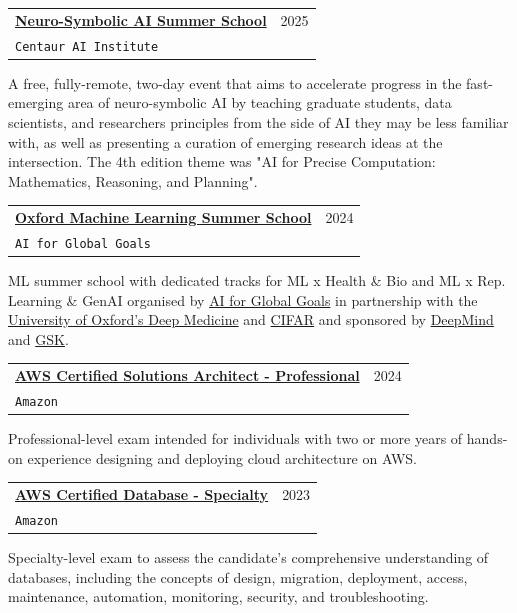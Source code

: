 \documentclass[letterpaper,11pt]{article}
\makeatletter
\newcommand{\resumeSubheading}[4]{
  \vspace{-2pt}\item
    \begin{tabular*}{0.97\textwidth}[t]{l@{\extracolsep{\fill}}r}
      \textbf{#1} & #2 \\
      \texttt{\small#3} & \textit{\small #4} \\
    \end{tabular*}\vspace{-7pt}
}
\makeatother
\begin{document}
    \vspace{2mm}
    \resumeSubheading
      {\href{https://luma.com/pqzv80yd}{Neuro-Symbolic AI Summer School}}{2025}
      {Centaur AI Institute}{}
    \vspace{2mm}
    
    A free, fully-remote, two-day event that aims to accelerate progress in the fast-emerging area of neuro-symbolic AI by teaching graduate students, data scientists, and researchers principles from the side of AI they may be less familiar with, as well as presenting a curation of emerging research ideas at the intersection. The 4th edition theme was "AI for Precise Computation: Mathematics, Reasoning, and Planning".

    \vspace{2mm}
    \resumeSubheading
      {\href{https://www.oxfordml.school/}{Oxford Machine Learning Summer School}}{2024}
      {AI for Global Goals}{}
    \vspace{2mm}
    
    ML summer school with dedicated tracks for ML x Health \& Bio and ML x Rep. Learning \& GenAI organised by \href{https://www.globalgoals.ai/}{AI for Global Goals} in partnership with the \href{https://www.oxfordmartin.ox.ac.uk/deep-medicine/}{University of Oxford's Deep Medicine} and \href{https://cifar.ca/}{CIFAR} and sponsored by \href{https://www.deepmind.com/}{DeepMind} and \href{https://www.gsk.ai/}{GSK}.

    \vspace{2mm}
    \resumeSubheading
      {\href{https://aws.amazon.com/certification/certified-solutions-architect-associate/}{AWS Certified Solutions Architect - Professional}}{2024}
      {Amazon}{}
    \vspace{2mm}
    
    Professional-level exam intended for individuals with two or more years of hands-on experience designing and deploying cloud architecture on AWS.

    \vspace{2mm}
    \resumeSubheading
      {\href{https://aws.amazon.com/certification/certified-machine-learning-specialty/}{AWS Certified Database - Specialty}}{2023}
      {Amazon}{}
    \vspace{2mm}
    
    Specialty-level exam to assess the candidate's comprehensive understanding of databases, including the concepts of design, migration, deployment, access, maintenance, automation, monitoring, security, and troubleshooting.
    
\end{document}
